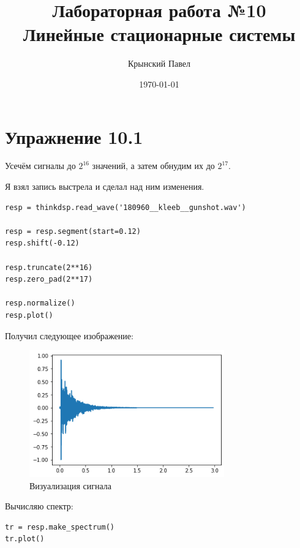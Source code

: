 \documentclass[a4paper,12pt]{report}
\title{Лабораторная работа №10\\Линейные стационарные системы}
\author{Крынский Павел}
\date{\today}
\begin{document}
\maketitle
\tableofcontents
\listoffigures
\lstlistoflistings

\maketitle

\chapter{Упражнение 10.1}

Усечём сигналы до $2^{16}$ значений, а затем обнудим их до $2^{17}$.

Я взял запись выстрела и сделал над ним изменения.

\begin{lstlisting}[caption=Усечение сигнала]
resp = thinkdsp.read_wave('180960__kleeb__gunshot.wav')

resp = resp.segment(start=0.12)
resp.shift(-0.12)

resp.truncate(2**16)
resp.zero_pad(2**17)

resp.normalize()
resp.plot()
\end{lstlisting}

Получил следующее изображение:

\begin{figure}[H]
        \centering
        \includegraphics[width=0.75\textwidth]{1.png}
        \caption{Визуализация сигнала}
        \label{1}
\end{figure}

Вычисляю спектр:

\begin{lstlisting}[caption=Спектр сигнала]
tr = resp.make_spectrum()
tr.plot()
\end{lstlisting}
\end{document}
